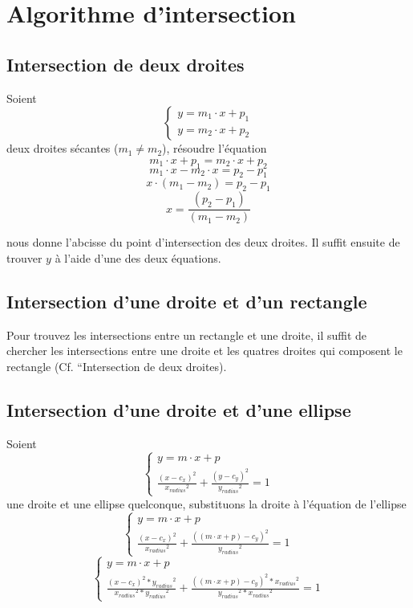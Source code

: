 \documentclass[a4paper,11pt]{report}
\begin{document}
\section[Intersection]{Algorithme d'intersection}

\subsection[Deux droites]{Intersection de deux droites}
Soient \\
$$\begin{cases}
y = m_1 \cdot x + p_1 \\
y = m_2 \cdot x + p_2
\end{cases}$$
deux droites sécantes ($m_1 \ne m_2$), résoudre l'équation \\
$$m_1 \cdot x + p_1 = m_2 \cdot x + p_2$$
$$m_1 \cdot x - m_2 \cdot x = p_2 - p_1 $$
$$x \cdot (m_1 - m_2) = p_2 - p_1$$
$$x = \frac{(p_2 - p_1)}{(m_1 - m_2)}$$

nous donne l'abcisse du point d'intersection des deux droites.
Il suffit ensuite de trouver $y$ à l'aide d'une des deux équations.

\subsection[Droite et rectangle]{Intersection d'une droite et d'un rectangle}
Pour trouvez les intersections entre un rectangle et une droite, il suffit de
chercher les intersections entre une droite et les quatres droites qui composent
le rectangle (Cf. ``Intersection de deux droites).

\subsection[Droite et ellipse]{Intersection d'une droite et d'une ellipse}
Soient \\
$$\begin{cases}
y = m \cdot x + p \\
\frac{(x - c_x)^2}{{x_{radius}}^2} + \frac{(y - c_y)^2}{{y_{radius}}^2} = 1
\end{cases}$$
une droite et une ellipse quelconque, substituons la droite à l'équation de
l'ellipse
$$\begin{cases}
y = m \cdot x + p \\
\frac{(x - c_x)^2}{{x_{radius}}^2} + \frac{((m \cdot x + p) - c_y)^2}{{y_{radius}}^2} = 1
\end{cases}$$
$$\begin{cases}
y = m \cdot x + p \\
\frac{(x - c_x)^2 * {y_{radius}}^2}{{x_{radius}}^2 * {y_{radius}}^2} +
\frac{((m \cdot x + p) - c_y)^2 * {x_{radius}}^2}{{y_{radius}}^2 * {x_{radius}}^2} = 1
\end{cases}$$
\end{document}
